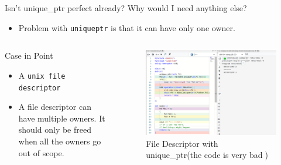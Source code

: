 \documentclass[
  10pt,
  ignorenonframetext,
]{beamer}
\providecommand{\tightlist}{%
  \setlength{\itemsep}{0pt}\setlength{\parskip}{0pt}}
\begin{document}
\begin{frame}{Isn't unique\_ptr perfect already?
Why would I need anything else?}
\protect\hypertarget{isnt-unique_ptr-perfect-already-why-would-i-need-anything-else}{}
\begin{itemize}
\tightlist
\item
  Problem with \texttt{unique\textunderscore ptr}
  is that it can have only one owner.
\end{itemize}

\pause

\begin{columns}[T]
\begin{column}{0.3\textwidth}
\begin{block}{Case in Point}
\protect\hypertarget{case-in-point}{}
\begin{itemize}
\tightlist
\item
  A \texttt{unix file descriptor}
\end{itemize}

\pause

\begin{itemize}
\tightlist
\item
  A file descriptor can have multiple owners. It
  should only be freed when all the owners go out
  of scope.
\end{itemize}
\end{block}
\end{column}

\begin{column}{0.7\textwidth}
\pause

\begin{figure}
\centering
\includegraphics{./fd.png}
\caption{File Descriptor with unique\_ptr(the code
is very bad🥲)}
\end{figure}
\end{column}
\end{columns}

\pause


\pause

\end{frame}
\end{document}
